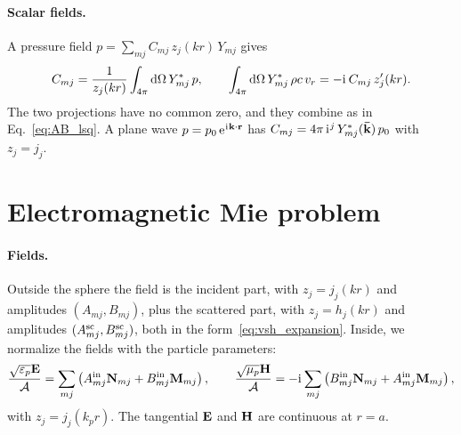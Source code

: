 \documentclass[
    pra,
    aps,
    reprint,
    onecolumn,
    amsmath,amssymb,
    a4paper,
    superscriptaddress,
    10pt,
    nofootinbib
]{revtex4-2}
\newcommand{\iu}{\mathrm{i}\mkern1mu}                 %
\newcommand{\eu}{\mathrm{e}\mkern1mu}                 %
\newcommand{\ort}[1]{\boldsymbol{\mathbf{\bar{#1}}}}  %
\begin{document}
\paragraph{Scalar fields.}
A pressure field $p = \sum_{mj} C_{mj}\, z_j(kr)\, Y_{mj}$ gives
\begin{equation}
    C_{mj} = \frac{1}{z_j(kr)}\int_{4\pi}\dd\Omega\, Y^*_{mj}\, p, \qquad
    \int_{4\pi}\dd\Omega\, Y^*_{mj}\, \rho c\, v_r = -\iu\, C_{mj}\, z_j'(kr) .
    \label{eq:scalar_projection}
\end{equation}
The two projections have no common zero, and they combine as in Eq.~\eqref{eq:AB_lsq}.
A plane wave $p = p_0\,\eu^{\iu\vb{k}\cdot\vb{r}}$ has $C_{mj} = 4\pi\, \iu^j\, Y^*_{mj}(\ort{k})\, p_0$ with $z_j = j_j$.

\section{Electromagnetic Mie problem}
\label{sec:mie_em}

\paragraph{Fields.}
Outside the sphere the field is the incident part, with $z_j = j_j(kr)$ and amplitudes $(A_{mj}, B_{mj})$, plus the scattered part, with $z_j = h_j(kr)$ and amplitudes $(A^{\rm sc}_{mj}, B^{\rm sc}_{mj})$, both in the form~\eqref{eq:vsh_expansion}.
Inside, we normalize the fields with the particle parameters:
\begin{equation}
    \frac{\sqrt{\varepsilon_p}\vb{E}}{\mathcal{A}} = \sum_{mj}\left( A^{\rm in}_{mj}\vb{N}_{mj} + B^{\rm in}_{mj}\vb{M}_{mj}\right), \qquad
    \frac{\sqrt{\mu_p}\vb{H}}{\mathcal{A}} = -\iu\sum_{mj}\left( B^{\rm in}_{mj}\vb{N}_{mj} + A^{\rm in}_{mj}\vb{M}_{mj}\right),
    \label{eq:internal_fields}
\end{equation}
with $z_j = j_j(k_p r)$.
The tangential $\vb{E}$ and $\vb{H}$ are continuous at $r = a$.
\end{document}
